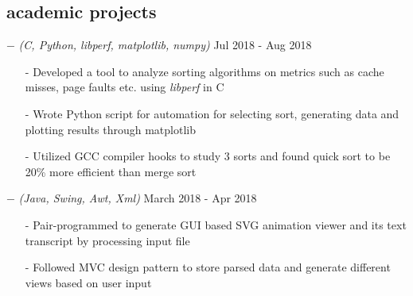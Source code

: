 \documentclass[a4paper, 10pt, oneside]{article}
\newcommand{\bulltetspace}{\vspace{-0.2em}}
\begin{document}

\vspace{-0.3em}
\begin{center}
\section{\color{headings}academic projects}
\vspace{-0.5em}


$-$ \color{headings}{Performance Analysis of Sorting Algorithms} \textit{(C, Python, libperf, matplotlib, numpy)}  \hfill Jul 2018 - Aug 2018
\color{text1}
\vspace{-0.3em}
\begin{itemize}
\bulltetspace
\item[-] Developed a tool to analyze sorting algorithms on metrics such as cache misses, page faults etc. using \textit{libperf} in C\\
\bulltetspace
\item[-] Wrote Python script for automation for selecting sort, generating data and plotting results through matplotlib \\
\bulltetspace
\item[-] Utilized GCC compiler hooks to study 3 sorts and found quick sort to be 20\% more efficient than merge sort
\vspace{0.0em}
\end{itemize}

$-$ \color{headings}{Animation generator based on MVC design pattern} \textit{(Java, Swing, Awt, Xml)} \hfill March 2018 - Apr 2018
\color{text1}
\vspace{-0.3em}
\begin{itemize}
\bulltetspace
\item[-] Pair-programmed to generate GUI based SVG animation viewer and its text transcript by processing input file\\
\bulltetspace
\item[-] Followed MVC design pattern to store parsed data and generate different views based on user input
\vspace{0.0em}
\end{itemize}


\end{center}
\end{document}
